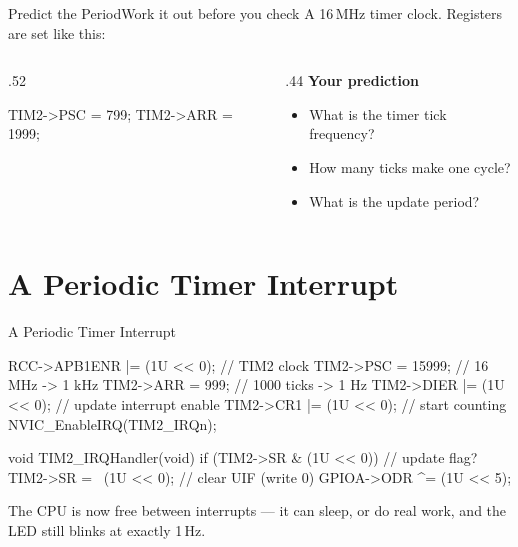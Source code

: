 \documentclass[9pt,aspectratio=169,xcolor=table]{beamer}
\begin{document}
{\beamerextras
\begin{frame}[fragile]{Predict the Period}{Work it out before you check}
    \leavevmode
    A 16\,MHz timer clock. Registers are set like this:

    \vspace{2mm}
    \begin{columns}[T]
    \begin{column}{.52\textwidth}
\begin{cc}[basicstyle=\ttfamily\small]
TIM2->PSC = 799;
TIM2->ARR = 1999;
\end{cc}
    \end{column}
    \begin{column}{.44\textwidth}
        \textbf{Your prediction}
        {\small
        \begin{itemize}\itemsep2pt
            \item What is the timer tick frequency?
            \item How many ticks make one cycle?
            \item What is the update period?
        \end{itemize}}
    \end{column}
    \end{columns}

    \vspace{2mm}
\end{frame}
}


\section{A Periodic Timer Interrupt}

\begin{frame}[fragile]{A Periodic Timer Interrupt}
\begin{cc}[basicstyle=\ttfamily\small]
RCC->APB1ENR |= (1U << 0);      // TIM2 clock
TIM2->PSC = 15999;              // 16 MHz -> 1 kHz
TIM2->ARR = 999;                // 1000 ticks -> 1 Hz
TIM2->DIER |= (1U << 0);        // update interrupt enable
TIM2->CR1  |= (1U << 0);        // start counting
NVIC_EnableIRQ(TIM2_IRQn);

void TIM2_IRQHandler(void)
{
    if (TIM2->SR & (1U << 0)) { // update flag?
        TIM2->SR = ~(1U << 0);  // clear UIF (write 0)
        GPIOA->ODR ^= (1U << 5);
    }
}
\end{cc}

    \vspace{2mm}
    {\small The CPU is now \alert{free} between interrupts --- it can sleep, or do
    real work, and the LED still blinks at exactly 1\,Hz.}
\end{frame}
\end{document}
